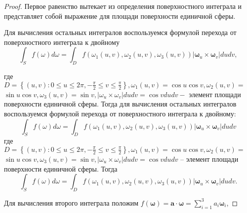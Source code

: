 \begin{proof}
    Первое равенство вытекает из определения поверхностного интеграла
    и представляет собой выражение для площади
    поверхности единичной сферы.


    Для вычисления остальных интегралов воспользуемся
    формулой перехода от поверхностного интеграла
    к двойному
    \begin{equation}
        \label{eq:1_2:16}
        \int_{S} f(\omega) d \omega=\int_{D} f
        \left(\omega_{1}(u, v), \omega_{2}(u, v),
        \omega_{3}(u, v)\right)\left|\boldsymbol{\omega}_{u}
        \times \boldsymbol{\omega}_{v}\right| d u d v,
    \end{equation}

    где $D=\left\{(u, v): 0 \leqslant u \leqslant 2 \pi,-\frac{\pi}{2}
    \leqslant v \leqslant \frac{\pi}{2}\right\},
    \omega_{1}(u, v)=\cos u \cos v, \omega_{2}(u, v)=$ $\sin u \cos v,
    \omega_{3}(u, v)=\sin v,\left|\omega_{u}
    \times \omega_{v}\right| d u d v=\cos v d u d v-$ элемент площади поверхности единичной сферы.
    Тогда для вычисления остальных интегралов воспользуемся
    формулой перехода от поверхностного интеграла
    к двойному:
    \[
        \int_{S} f(\omega) d \omega=\int_{D} f\left(\omega_{1}(u, v), \omega_{2}(u, v),
        \omega_{3}(u, v)\right)\left|\boldsymbol{\omega}_{u} \times \boldsymbol{\omega}_{v}\right| d u d v
    \]
    где $D=\left\{(u, v): 0 \leqslant u \leqslant 2 \pi,-\frac{\pi}{2} \leqslant v \leqslant
    \frac{\pi}{2}\right\}, \omega_{1}(u, v)=\cos u \cos v, \omega_{2}(u, v)=$ $\sin u \cos v,
    \omega_{3}(u, v)=\sin v,\left|\omega_{u} \times \omega_{v}\right| d u d v=\cos v d u d v$
    -- элемент площади поверхности единичной сферы.
    Тогда
    \[
        \int_{S} f(\omega) d \omega=\int_{D} f\left(\omega_{1}(u, v), \omega_{2}(u, v),
        \omega_{3}(u, v)\right)\left|\boldsymbol{\omega}_{u}
        \times \boldsymbol{\omega}_{v}\right| d u d v.
    \]

    Для вычисления второго интеграла положим
    $f(\boldsymbol{\omega})=\mathbf{a}
    \cdot \boldsymbol{\omega}=\sum_{i=1}^{3} a_{i} \boldsymbol{\omega}_{i}$,


\end{proof}
